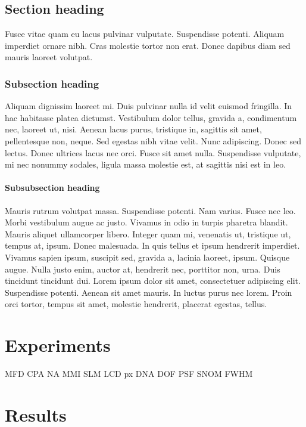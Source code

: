 \documentclass[
	english,    %
	thesis,    %
]{scientific}
\begin{document}
\section{Section heading}

Fusce vitae quam eu lacus pulvinar vulputate. Suspendisse potenti. Aliquam imperdiet ornare nibh. Cras molestie tortor non erat. Donec dapibus diam sed mauris laoreet volutpat. 

\subsection{Subsection heading}

Aliquam dignissim laoreet mi. Duis pulvinar nulla id velit euismod fringilla. In hac habitasse platea dictumst. Vestibulum dolor tellus, gravida a, condimentum nec, laoreet ut, nisi. Aenean lacus purus, tristique in, sagittis sit amet, pellentesque non, neque. Sed egestas nibh vitae velit. Nunc adipiscing. Donec sed lectus. Donec ultrices lacus nec orci. Fusce sit amet nulla. Suspendisse vulputate, mi nec nonummy sodales, ligula massa molestie est, at sagittis nisi est in leo.

\subsubsection{Subsubsection heading}

Mauris rutrum volutpat massa. Suspendisse potenti. Nam varius. Fusce nec leo. Morbi vestibulum augue ac justo. Vivamus in odio in turpis pharetra blandit. Mauris aliquet ullamcorper libero. Integer quam mi, venenatis ut, tristique ut, tempus at, ipsum. Donec malesuada. In quis tellus et ipsum hendrerit imperdiet. Vivamus sapien ipsum, suscipit sed, gravida a, lacinia laoreet, ipsum. Quisque augue. Nulla justo enim, auctor at, hendrerit nec, porttitor non, urna. Duis tincidunt tincidunt dui. Lorem ipsum dolor sit amet, consectetuer adipiscing elit. Suspendisse potenti. Aenean sit amet mauris. In luctus purus nec lorem. Proin orci tortor, tempus sit amet, molestie hendrerit, placerat egestas, tellus.

\chapter{Experiments}

\gls{MFD}
\gls{CPA}
\gls{NA}
\gls{MMI}
\gls{SLM}
\gls{LCD}
\gls{px}
\gls{DNA}
\gls{DOF}
\gls{PSF}
\gls{SNOM}
\gls{FWHM}

\chapter{Results}
\end{document}
